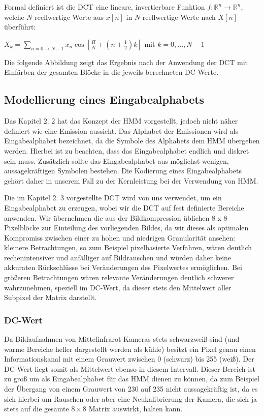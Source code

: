  Formal definiert ist die DCT eine lineare, invertierbare Funktion $f : \mathbb{R}^n \rightarrow \mathbb{R}^n$, welche $N$ reellwertige Werte aus $x[n]$ in $N$ reellwertige Werte nach $X[n]$ überführt:

 $X_k = \sum\limits_{n=0\rightarrow N-1} x_n \cos [\frac{\Pi}{N} + (n + \frac{1}{2}) k ]$ mit $k = 0,..., N-1$


Die folgende Abbildung zeigt das Ergebnis nach der Anwendung der DCT mit Einfärben der gesamten Blöcke in die jeweils berechneten DC-Werte.


\subsection{Modellierung eines Eingabealphabets}

Das Kapitel 2.
2 hat das Konzept der HMM vorgestellt, jedoch nicht näher definiert wie eine Emission aussieht.
 Das Alphabet der Emissionen wird als Eingabealphabet bezeichnet, da die Symbole des Alphabets dem HMM übergeben werden.
 Hierbei ist zu beachten, dass das Eingabealphabet endlich und diskret sein muss.
 Zusätzlich sollte das Eingabealphabet aus möglichst wenigen, aussagekräftigen Symbolen bestehen.
 Die Kodierung eines Eingabealphabets gehört daher in unserem Fall zu der Kernleistung bei der Verwendung von HMM.
 

Die im Kapitel 2.
3 vorgestellte DCT wird von uns verwendet, um ein Eingabealphabet zu erzeugen, wobei wir die DCT auf fest definierte Bereiche anwenden.
 Wir übernehmen die aus der Bildkompression üblichen 8 x 8 Pixelblöcke zur Einteilung des vorliegenden Bildes, da wir dieses als optimalen Kompromiss zwischen einer zu hohen und niedrigen Granularität ansehen: kleinere Betrachtungen, so zum Beispiel pixelbasierte Verfahren, wären deutlich rechenintensiver und anfälliger auf Bildrauschen und würden daher keine akkuraten Rückschlüsse bei Veränderungen des Pixelwertes ermöglichen.
 Bei größeren Betrachtungen wären relevante Veränderungen deutlich schwerer wahrzunehmen, speziell im DC-Wert, da dieser stets den Mittelwert aller Subpixel der Matrix darstellt.
 

\subsubsection{DC-Wert}

Da Bildaufnahmen von Mittelinfrarot-Kameras stets schwarzweiß sind (und warme Bereiche heller dargestellt werden als kühle) besitzt ein Pixel genau einen Informationskanal mit einem Grauwert zwischen 0 (schwarz) bis 255 (weiß).
 Der DC-Wert liegt somit als Mittelwert ebenso in diesem Intervall.
 Dieser Bereich ist zu groß um als Eingabealphabet für das HMM dienen zu können, da zum Beispiel der Übergang von einem Grauwert von 230 auf 235 nicht aussagekräftig ist, da es sich hierbei um Rauschen oder aber eine Neukalibrierung der Kamera, die sich ja stets auf die gesamte $8 \times 8$ Matrix auswirkt, halten kann.
 

